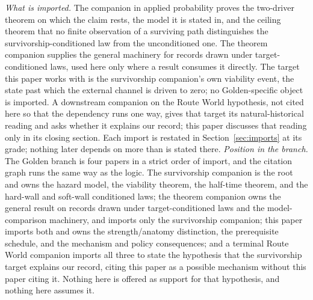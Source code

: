 \emph{What is imported.} The companion in applied probability
\cite{GoldenSurvivorship} proves the two-driver theorem on which the claim rests,
the model it is stated in, and the ceiling theorem that no finite
observation of a surviving path distinguishes the survivorship-conditioned
law from the unconditioned one. The theorem companion \cite{GoldenTargeted} supplies the general
machinery for records drawn under target-conditioned laws, used here
only where a result consumes it directly. The target this paper works with is the survivorship companion's own
viability event, the state past which the external channel is driven to
zero; no Golden-specific object is imported. A downstream companion on
the Route World hypothesis, not cited here so that the dependency runs
one way, gives that target its natural-historical reading and asks
whether it explains our record; this paper discusses that reading only
in its closing section. Each import is restated in
Section~\ref{sec:imports} at its grade; nothing later depends on more
than is stated there.
\emph{Position in the branch.} The Golden branch is four papers in a
strict order of import, and the citation graph runs the same way as the
logic. The survivorship companion \cite{GoldenSurvivorship} is the root and owns the
hazard model, the viability theorem, the half-time theorem, and the
hard-wall and soft-wall conditioned laws; the theorem companion
\cite{GoldenTargeted} owns the general result on records drawn under
target-conditioned laws and the model-comparison machinery, and imports
only the survivorship companion; this paper imports both and owns the
strength/anatomy distinction, the prerequisite schedule, and the
mechanism and policy consequences; and a terminal Route World companion
imports all three to state the hypothesis that the survivorship target
explains our record, citing this paper as a possible mechanism without
this paper citing it. Nothing here is offered as support for that
hypothesis, and nothing here assumes it.


